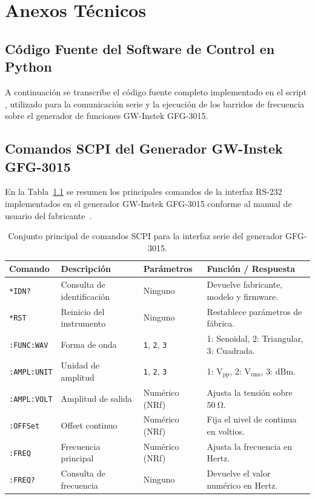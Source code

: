 \chapter{Anexos Técnicos}

\section{Código Fuente del Software de Control en Python}
A continuación se transcribe el código fuente completo implementado en el script
, utilizado para la comunicación serie y la ejecución de los barridos de
frecuencia sobre el generador de funciones GW-Instek GFG-3015.



\section{Comandos SCPI del Generador GW-Instek GFG-3015}
En la Tabla~\ref{tab.anexo:comandos_scpi} se resumen los principales comandos de la interfaz RS-232 implementados en
el generador GW-Instek GFG-3015 conforme al manual de usuario del fabricante~\cite{gwinstek_gfg3015}.

\begin{table}[!ht]
    \centering
    \small
    \begin{tabular}{|l|p{4.2cm}|l|p{4.5cm}|}
        \hline
        \textbf{Comando} & \textbf{Descripción} & \textbf{Parámetros} & \textbf{Función / Respuesta} \\ \hline
        \texttt{*IDN?} & Consulta de identificación & Ninguno & Devuelve fabricante, modelo y firmware. \\ \hline
        \texttt{*RST} & Reinicio del instrumento & Ninguno & Restablece parámetros de fábrica. \\ \hline
        \texttt{:FUNC:WAV} & Forma de onda & \texttt{1}, \texttt{2}, \texttt{3} & 1: Senoidal, 2: Triangular, 3: Cuadrada. \\ \hline
        \texttt{:AMPL:UNIT} & Unidad de amplitud & \texttt{1}, \texttt{2}, \texttt{3} & 1: $\mathrm{V_{pp}}$, 2: $\mathrm{V_{rms}}$, 3: $\mathrm{dBm}$. \\ \hline
        \texttt{:AMPL:VOLT} & Amplitud de salida & Numérico (NRf) & Ajusta la tensión sobre $\qty{50}{\ohm}$. \\ \hline
        \texttt{:OFFSet} & Offset continuo & Numérico (NRf) & Fija el nivel de continua en voltios. \\ \hline
        \texttt{:FREQ} & Frecuencia principal & Numérico (NRf) & Ajusta la frecuencia en Hertz. \\ \hline
        \texttt{:FREQ?} & Consulta de frecuencia & Ninguno & Devuelve el valor numérico en Hertz. \\ \hline
    \end{tabular}
    \caption{Conjunto principal de comandos SCPI para la interfaz serie del generador GFG-3015.}
    \label{tab.anexo:comandos_scpi}
\end{table}
